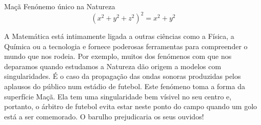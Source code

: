 \begin{surferPage}{Maçã}
Fen\'onemo \'unico na Natureza\\
\smallskip
\[(x^2+ y^2+ z^2)^2	= x^2+ y^2\]

\singlespacing
A Matem\'atica est\'a intimamente ligada a outras ci\^encias como a F\'isica, a Qu\'imica ou a tecnologia e fornece poderosas ferramentas para compreender o mundo que nos rodeia.
\singlespacing
Por exemplo, muitos dos fen\'omenos com que nos deparamos quando estudamos a Natureza d\~ao origem a modelos com singularidades.
\singlespacing
\'E o caso da propaga\c c\~ao das ondas sonoras produzidas pelos aplausos do p\'ublico num est\'adio de futebol. Este fen\'omeno toma a forma da superf\'icie Ma\c c\~a. Ela tem uma  singularidade bem  v\'isivel no seu centro e, portanto, o \'arbitro de futebol evita estar neste ponto do campo quando um golo est\'a a ser comemorado. O barulho prejudicaria os seus ouvidos!
\end{surferPage}

